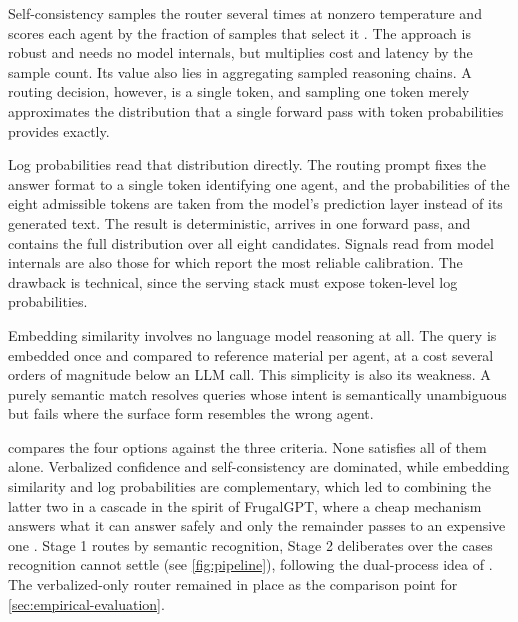Self-consistency samples the router several times at nonzero temperature and scores each agent by the fraction of samples that select it \autocite{wang2023}. The approach is robust and needs no model internals, but multiplies cost and latency by the sample count. Its value also lies in aggregating sampled reasoning chains. A routing decision, however, is a single token, and sampling one token merely approximates the distribution that a single forward pass with token probabilities provides exactly.

Log probabilities read that distribution directly. The routing prompt fixes the answer format to a single token identifying one agent, and the probabilities of the eight admissible tokens are taken from the model's prediction layer instead of its generated text. The result is deterministic, arrives in one forward pass, and contains the full distribution over all eight candidates. Signals read from model internals are also those for which \textcite{kadavath2022} report the most reliable calibration. The drawback is technical, since the serving stack must expose token-level log probabilities.

Embedding similarity involves no language model reasoning at all. The query is embedded once and compared to reference material per agent, at a cost several orders of magnitude below an LLM call. This simplicity is also its weakness. A purely semantic match resolves queries whose intent is semantically unambiguous but fails where the surface form resembles the wrong agent.

 compares the four options against the three criteria. None satisfies all of them alone. Verbalized confidence and self-consistency are dominated, while embedding similarity and log probabilities are complementary, which led to combining the latter two in a cascade in the spirit of FrugalGPT, where a cheap mechanism answers what it can answer safely and only the remainder passes to an expensive one \autocite{chen2023}. Stage 1 routes by semantic recognition, Stage 2 deliberates over the cases recognition cannot settle (see \cref{fig:pipeline}), following the dual-process idea of \textcite{kahneman2011}. The verbalized-only router remained in place as the comparison point for \cref{sec:empirical-evaluation}.

